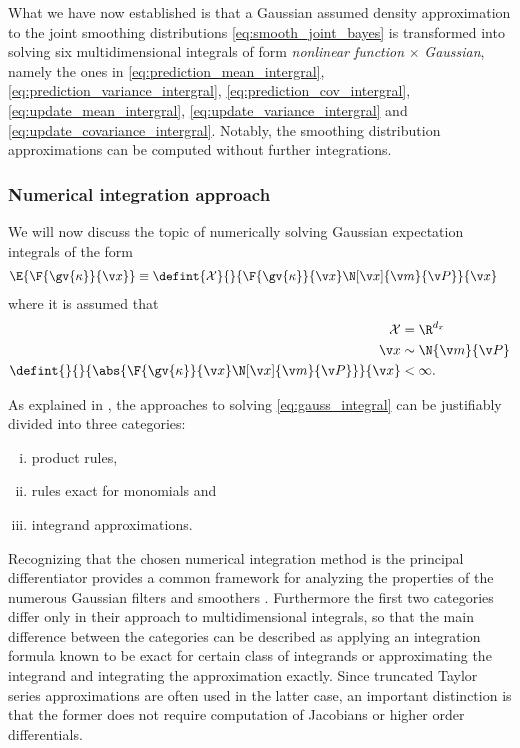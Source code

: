 %
What we have now established is that a Gaussian assumed density approximation to the joint 
smoothing distributions \eqref{eq:smooth_joint_bayes} is transformed into solving six
multidimensional integrals of form \emph{nonlinear function} $\times$ \emph{Gaussian}, 
namely the ones in
\eqref{eq:prediction_mean_intergral}, \eqref{eq:prediction_variance_intergral}, \eqref{eq:prediction_cov_intergral},
\eqref{eq:update_mean_intergral}, \eqref{eq:update_variance_intergral} and
\eqref{eq:update_covariance_intergral}. 
Notably, the smoothing distribution approximations can be computed
without further integrations.

\subsubsection{Numerical integration approach}
 We will now discuss the topic of numerically solving Gaussian 
 expectation integrals of the form
 \begin{align}
	\E{\F{\gv{\kappa}}{\x}}&\equiv \defint{\mathcal{X}}{}{\F{\gv{\kappa}}{\x}\N[\x]{\m}{\P}}{\x}
	\label{eq:gauss_integral}
\end{align}%
where it is assumed that 
\begin{align*}
	\mathcal{X} &= \R^{d_x}\\
	\x &\sim \N{\m}{\P}\\
	\defint{}{}{\abs{\F{\gv{\kappa}}{\x}\N[\x]{\m}{\P}}}{\x} & < \infty. 
\end{align*}

As explained in \textcite{Wu2006}, the approaches to solving \eqref{eq:gauss_integral}
can be justifiably divided into three categories: 
\begin{enumerate}[i)] \addtolength{\leftskip}{.5cm} \itemsep1pt \parskip0pt 
  \item product rules,
  \item rules exact for monomials and
  \item integrand approximations.
\end{enumerate}
Recognizing that the chosen numerical integration method is the principal differentiator provides a 
common framework for analyzing the properties of the numerous Gaussian filters and smoothers 
\parencite{Sarkka2010, Sarkka2008a,Ito2000,Wu2006,julier1997new,Arasaratnam2009,Arasaratnam2011}.
Furthermore the first two categories differ only in their approach to multidimensional integrals,
so that the main difference between the categories can be described
as applying an integration formula known to be exact for certain class of integrands
or approximating the integrand and integrating the approximation exactly.
Since truncated Taylor series approximations are often used in the latter case, an important distinction
is that the former does not require computation of Jacobians or higher order differentials. 

